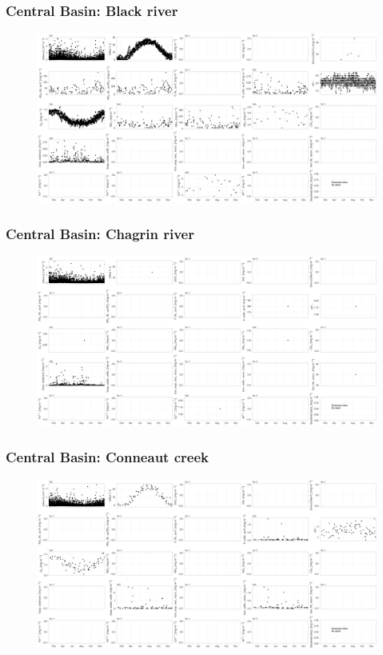 \documentclass{beamer}
\begin{document}
\begin{frame}
\frametitle{Central Basin: Black river}
\begin{figure}
\includegraphics[width=\textwidth]{rivers/Central basin/plot_1yr blackriver.png}
\end{figure}
\end{frame}

\begin{frame}
\frametitle{Central Basin: Chagrin river}
\begin{figure}
\includegraphics[width=\textwidth]{rivers/Central basin/plot_1yr chagrinriver.png}
\end{figure}
\end{frame}

\begin{frame}
\frametitle{Central Basin: Conneaut creek}
\begin{figure}
\includegraphics[width=\textwidth]{rivers/Central basin/plot_1yr conneautcreek.png}
\end{figure}
\end{frame}
\end{document}
